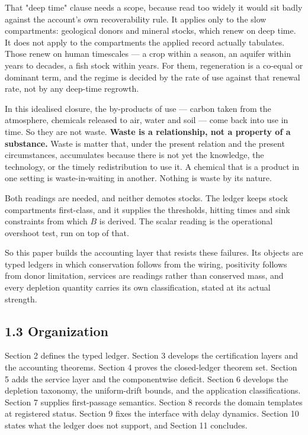 \documentclass[11pt]{article}
\begin{document}
That "deep time" clause needs a scope, because read too widely it would sit badly against the account's own recoverability rule. It applies only to the slow compartments: geological donors and mineral stocks, which renew on deep time. It does not apply to the compartments the applied record actually tabulates. Those renew on human timescales --- a crop within a season, an aquifer within years to decades, a fish stock within years. For them, regeneration is a co-equal or dominant term, and the regime is decided by the rate of use against that renewal rate, not by any deep-time regrowth.

In this idealised closure, the by-products of use --- carbon taken from the atmosphere, chemicals released to air, water and soil --- come back into use in time. So they are not waste. \textbf{Waste is a relationship, not a property of a substance.} Waste is matter that, under the present relation and the present circumstances, accumulates because there is not yet the knowledge, the technology, or the timely redistribution to use it. A chemical that is a product in one setting is waste-in-waiting in another. Nothing is waste by its nature.

Both readings are needed, and neither demotes stocks. The ledger keeps stock compartments first-class, and it supplies the thresholds, hitting times and sink constraints from which \(B\) is derived. The scalar reading is the operational overshoot test, run on top of that.

So this paper builds the accounting layer that resists these failures. Its objects are typed ledgers in which conservation follows from the wiring, positivity follows from donor limitation, services are readings rather than conserved mass, and every depletion quantity carries its own classification, stated at its actual strength.

\subsection*{1.3 Organization}\label{13-organization}

Section 2 defines the typed ledger. Section 3 develops the certification layers and the accounting theorems. Section 4 proves the closed-ledger theorem set. Section 5 adds the service layer and the componentwise deficit. Section 6 develops the depletion taxonomy, the uniform-drift bounds, and the application classifications. Section 7 supplies first-passage semantics. Section 8 records the domain templates at registered status. Section 9 fixes the interface with delay dynamics. Section 10 states what the ledger does not support, and Section 11 concludes.
\end{document}
